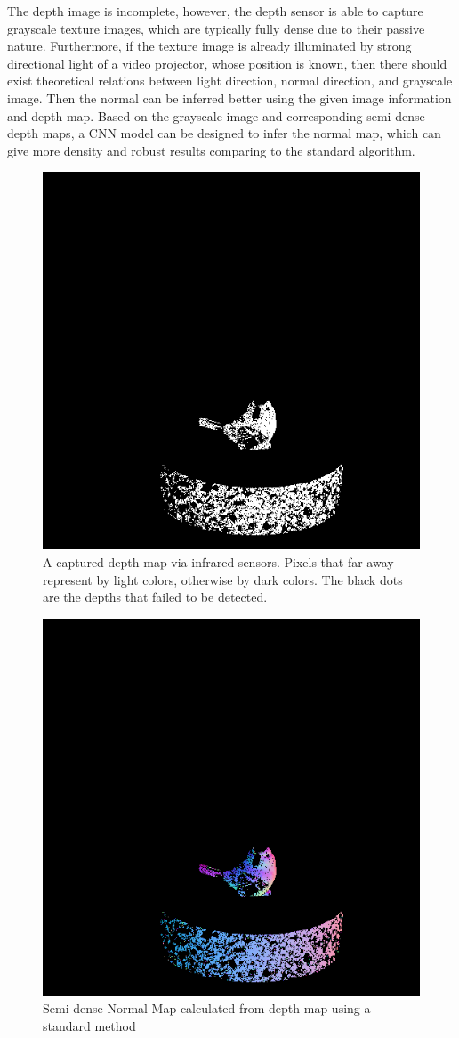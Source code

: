 The depth image is incomplete, however, the depth sensor is able to capture grayscale texture images, which are typically fully dense due to their passive nature. Furthermore, if the texture image is already illuminated by strong directional light of a video projector, whose position is known, then there should exist theoretical relations between light direction, normal direction, and grayscale image. Then the normal can be inferred better using the given image information and depth map.  Based on the grayscale image and corresponding semi-dense depth maps, a CNN model can be designed to infer the normal map, which can give more density and robust results comparing to the standard algorithm. 


\begin{figure}[th]
	\centering
	\includegraphics[width=.4\textwidth]{Figures/kinect-depth.png}
	\decoRule
	\caption{A captured depth map via infrared sensors. Pixels that far away represent by light colors, otherwise by dark colors. The black dots are the depths that failed to be detected.}
\label{fig:depth-map-with-noise}
\end{figure}



\begin{figure}[th]
	\centering
	\includegraphics[width=.4\textwidth]{Figures/real-normal.png}
	\decoRule
	\caption{Semi-dense Normal Map calculated from depth map using a standard method}
\label{fig:standard-normal-inference}
\end{figure}


